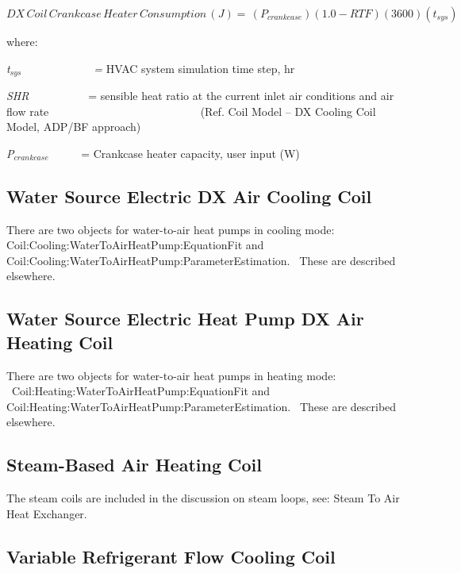 \begin{equation}
DX\,Coil\,Crankcase\,Heater\,Consumption\,(J) = \,\left( {{P_{crankcase}}} \right)\left( {1.0 - RTF} \right)\left( {3600} \right)\left( {{t_{sys}}} \right)
\end{equation}

where:

\emph{t\(_{sys}\)~~~~~~~~~~~~ =} HVAC system simulation time step, hr

\emph{SHR}~~~~~~~~~~ = sensible heat ratio at the current inlet air conditions and air flow rate ~~~~~~~~~~~~~~~~~~~~~~~~~~ (Ref. Coil Model -- DX Cooling Coil Model, ADP/BF approach)

\emph{P\(_{crankcase}\)~~~~~} = Crankcase heater capacity, user input (W)

\subsection{Water Source Electric DX Air Cooling Coil}\label{water-source-electric-dx-air-cooling-coil}

There are two objects for water-to-air heat pumps in cooling mode: \\ Coil:Cooling:WaterToAirHeatPump:EquationFit and Coil:Cooling:WaterToAirHeatPump:ParameterEstimation.~ These are described elsewhere.

\subsection{Water Source Electric Heat Pump DX Air Heating Coil}\label{water-source-electric-heat-pump-dx-air-heating-coil}

There are two objects for water-to-air heat pumps in heating mode: \\ ~Coil:Heating:WaterToAirHeatPump:EquationFit and Coil:Heating:WaterToAirHeatPump:ParameterEstimation.~ These are described elsewhere.

\subsection{Steam-Based Air Heating Coil}\label{steam-based-air-heating-coil}

The steam coils are included in the discussion on steam loops, see: Steam To Air Heat Exchanger.

\subsection{Variable Refrigerant Flow Cooling Coil}\label{variable-refrigerant-flow-cooling-coil}

